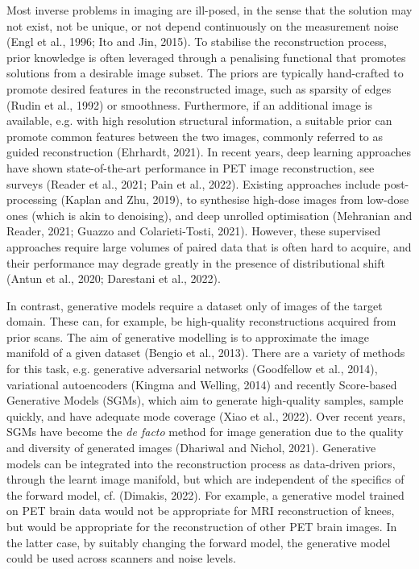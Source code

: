 \documentclass{article}
\begin{document}
Most inverse problems in imaging are ill-posed, in the sense that the solution may not exist, not be unique, or not depend continuously on the measurement noise (Engl et al., 1996; Ito and Jin, 2015). To stabilise the reconstruction process, prior knowledge is often leveraged through a penalising functional that promotes solutions from a desirable image subset. The priors are typically hand-crafted to promote desired features in the reconstructed image, such as sparsity of edges (Rudin et al., 1992) or smoothness. Furthermore, if an additional image is available, e.g. with high resolution structural information, a suitable prior can promote common features between the two images, commonly referred to as guided reconstruction (Ehrhardt, 2021). In recent years, deep learning approaches have shown state-of-the-art performance in PET image reconstruction, see surveys (Reader et al., 2021; Pain et al., 2022). Existing approaches include post-processing (Kaplan and Zhu, 2019), to synthesise high-dose images from low-dose ones (which is akin to denoising), and deep unrolled optimisation (Mehranian and Reader, 2021; Guazzo and Colarieti-Tosti, 2021). However, these supervised approaches require large volumes of paired data that is often hard to acquire, and their performance may degrade greatly in the presence of distributional shift (Antun et al., 2020; Darestani et al., 2022).

In contrast, generative models require a dataset only of images of the target domain. These can, for example, be high-quality reconstructions acquired from prior scans. The aim of generative modelling is to approximate the image manifold of a given dataset (Bengio et al., 2013). There are a variety of methods for this task, e.g. generative adversarial networks (Goodfellow et al., 2014), variational autoencoders (Kingma and Welling, 2014) and recently Score-based Generative Models (SGMs), which aim to generate high-quality samples, sample quickly, and have adequate mode coverage (Xiao et al., 2022). Over recent years, SGMs have become the \textit{de facto} method for image generation due to the quality and diversity of generated images (Dhariwal and Nichol, 2021). Generative models can be integrated into the reconstruction process as data-driven priors, through the learnt image manifold, but which are independent of the specifics of the forward model, cf. (Dimakis, 2022). For example, a generative model trained on PET brain data would not be appropriate for MRI reconstruction of knees, but would be appropriate for the reconstruction of other PET brain images. In the latter case, by suitably changing the forward model, the generative model could be used across scanners and noise levels.
\end{document}
